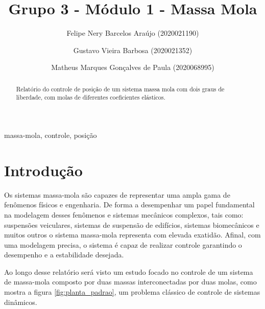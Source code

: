 \documentclass{ifacconf}
\begin{document}
\begin{frontmatter}

\title{Grupo 3 - Módulo 1 - Massa Mola} 


\author[First]{Felipe Nery Barcelos Araújo (2020021190)} 
\author[First]{Gustavo Vieira Barbosa (2020021352)} 
\author[First]{Matheus Marques Gonçalves de Paula (2020068995)}

\address[First]{
  Engenharia de Controle e Automação,\\ Universidade Federal de Minas Gerais, MG \\
   (e-mails: felipenery@ufmg.br, gustavovbarbosa@ufmg.br, mmgp@ufmg.br)
}

\begin{abstract}               
Relatório do controle de posição de um sistema massa mola com dois graus de liberdade, com molas de diferentes coeficientes 
elásticos.
\end{abstract}

\begin{keyword}
massa-mola, controle, posição
\end{keyword}

\end{frontmatter}


\section{Introdução}

Os sistemas massa-mola são capazes de representar uma ampla gama de fenômenos
físicos e engenharia. De forma a desempenhar um papel fundamental na modelagem 
desses fenômenos e sistemas mecânicos complexos, tais como: suspensões veiculares, 
sistemas de suspensão de edifícios, sistemas biomecânicos e muitos outros o sistema 
massa-mola representa com elevada exatidão. Afinal, com uma modelagem precisa, o sistema
é capaz de realizar controle garantindo o desempenho e a estabilidade desejada.

Ao longo desse relatório será visto um estudo focado no controle de um sistema de massa-mola 
composto por duas massas interconectadas por duas molas, como mostra a figura \ref{fig:planta_padrao}, um problema
clássico de controle de sistemas dinâmicos. 
\end{document}
